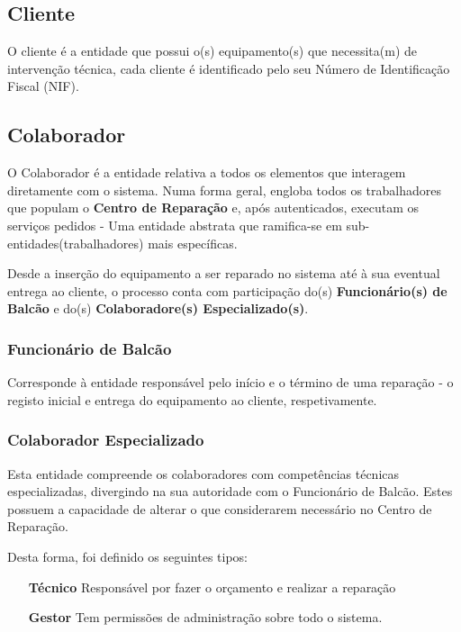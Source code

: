 \documentclass[a4paper,12pt]{scrreprt}
\begin{document}
\subsection{Cliente}\label{ent_cliente}
O cliente é a entidade que possui o(s) equipamento(s) que necessita(m) de intervenção técnica, cada cliente é identificado pelo 
seu Número de Identificação Fiscal (NIF).

\subsection{Colaborador} \label{ent_colaborador}
O Colaborador é a entidade relativa a todos os elementos que interagem diretamente com o sistema. 
Numa forma geral, engloba todos os trabalhadores que populam o \textbf{Centro de Reparação} e, após autenticados, executam os
serviços pedidos - Uma entidade abstrata que ramifica-se em sub-entidades(trabalhadores) mais específicas.

Desde a inserção do equipamento a ser reparado no sistema até à sua eventual entrega ao cliente, o processo conta com participação
do(s) \textbf{Funcionário(s) de Balcão} e do(s) \textbf{Colaboradore(s) Especializado(s)}.

\subsubsection{Funcionário de Balcão} \label{ent_func_balcao}
Corresponde à entidade responsável pelo início e o término de uma reparação - o registo inicial e entrega do equipamento ao cliente, respetivamente.  

\subsubsection{Colaborador Especializado} \label{ent_colab_especializado}
Esta entidade compreende os colaboradores com competências técnicas especializadas, divergindo na sua autoridade com o Funcionário de Balcão. 
Estes possuem a capacidade de alterar o que considerarem necessário no Centro de Reparação.

Desta forma, foi definido os seguintes tipos:
\begin{itemize}
    \item[\textbf{Técnico}]{Responsável por fazer o orçamento e realizar a reparação}
    \item[\textbf{Gestor}]{Tem permissões de administração sobre todo o sistema.}
\end{itemize}
\end{document}

